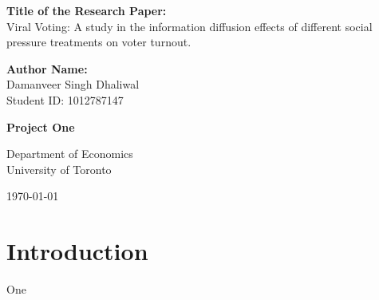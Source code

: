 \documentclass[11pt]{article}
\begin{document}
\begin{titlepage}
    \centering
    \vspace*{2cm}
    
    \vspace{0.5cm}

    \Large{\textbf{Title of the Research Paper:}}\\
    Viral Voting: A study in the information diffusion effects of different social pressure treatments on voter turnout.
    
    \vspace{0.5cm}

    \Large{\textbf{Author Name:}}\\
    \Large{Damanveer Singh Dhaliwal}\\
    \Large{Student ID: 1012787147}

    \vspace{0.5cm}
    
    \Large{\textbf{Project One}}
    
    \vfill
    
    \large{Department of Economics}\\
    \large{University of Toronto}
    
    \vspace{0.8cm}
    
    \large{\today}
    
\end{titlepage}

\section{Introduction}
One 



\end{document}
